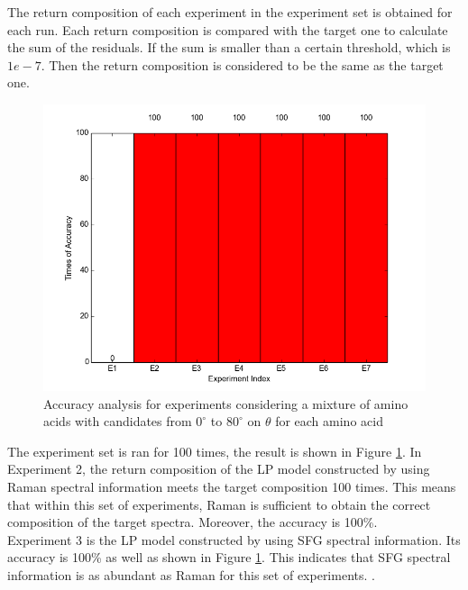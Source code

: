 The return composition of each experiment in the experiment set is obtained for each run. Each return composition is compared with the target one to calculate the sum of the residuals. If the sum is smaller than a certain threshold, which is $1e-7$. Then the return composition is considered to be the same as the target one. \\


\begin{figure}[!ht] \label{fig:5.1}
\centering
\includegraphics[scale=0.7]{Figures/accuracy_pecent_result8_mixture.png}
\caption{Accuracy analysis for experiments considering a mixture of amino acids with candidates from $0^{\circ}$ to $80^{\circ}$ on $\theta$ for each amino acid} 
\end{figure}

The experiment set is ran for 100 times, the result is shown in 
Figure \ref{fig:5.1}. In Experiment 2, the return composition of the LP model constructed by using Raman spectral information meets the target composition 100 times. This means that within this set of experiments, Raman is sufficient to obtain the correct composition of the target spectra. Moreover, the accuracy is 100\%. \\

Experiment 3 is the LP model constructed by using SFG spectral information. Its accuracy is 100\% as well as shown in Figure \ref{fig:5.1}. This indicates that SFG spectral information is as abundant as Raman for this set of experiments. . \\

